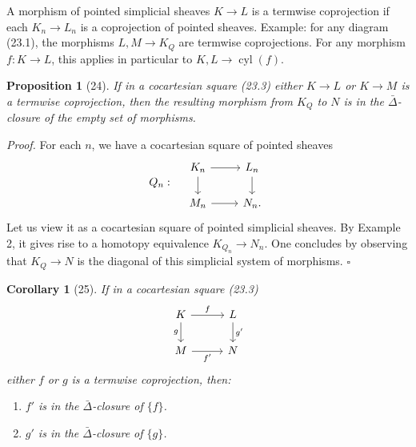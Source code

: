 \documentclass[11pt]{article}
\theoremstyle{deligne}
\newtheorem*{proposition*}{Proposition}
\newtheorem*{corollary*}{Corollary}
\newenvironment{proofdel}{\noindent\textit{Proof.}}{\hfill$\square$}
\newcommand{\cyl}{\operatorname{cyl}}
\begin{document}
A morphism of pointed simplicial sheaves \(K\to L\) is a termwise coprojection if each \(K_n\to L_n\) is a coprojection of pointed sheaves. Example: for any diagram (23.1), the morphisms \(L,M\to K_Q\) are termwise coprojections. For any morphism \(f:K\to L\), this applies in particular to \(K,L\to \cyl(f)\).

\begin{proposition*}[24]
If in a cocartesian square (23.3) either \(K\to L\) or \(K\to M\) is a termwise coprojection, then the resulting morphism from \(K_Q\) to \(N\) is in the \(\bar\Delta\)-closure of the empty set of morphisms.
\end{proposition*}

\begin{proofdel}
For each \(n\), we have a cocartesian square of pointed sheaves
\[
Q_n:\quad
\begin{tikzcd}[column sep=2.4em,row sep=1.6em]
K_n \arrow[r] \arrow[d] & L_n \arrow[d] \\
M_n \arrow[r] & N_n .
\end{tikzcd}
\]
Let us view it as a cocartesian square of pointed simplicial sheaves. By Example 2, it gives rise to a homotopy equivalence \(K_{Q_n}\to N_n\). One concludes by observing that \(K_Q\to N\) is the diagonal of this simplicial system of morphisms.
\end{proofdel}

\begin{corollary*}[25]
If in a cocartesian square (23.3)
\[
\begin{tikzcd}[column sep=2.8em,row sep=1.8em]
K \arrow[r,"f"] \arrow[d,"g"'] & L \arrow[d,"g'"] \\
M \arrow[r,"f'"'] & N
\end{tikzcd}
\]
either \(f\) or \(g\) is a termwise coprojection, then:
\begin{enumerate}[label=\arabic*.]
\item \(f'\) is in the \(\bar\Delta\)-closure of \(\{f\}\).
\item \(g'\) is in the \(\bar\Delta\)-closure of \(\{g\}\).
\end{enumerate}
\end{corollary*}
\end{document}
